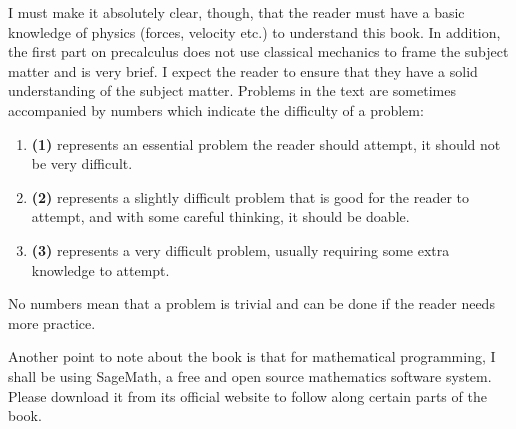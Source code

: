 \documentclass[envcountchap]{SNmono}
\begin{document}
  I must make it absolutely clear, though, that the reader must have a basic knowledge of physics (forces, velocity etc.) to understand this book. In addition, the first part on precalculus does not use classical mechanics to frame the subject matter and is very brief. I expect the reader to ensure that they have a solid understanding of the subject matter. Problems in the text are sometimes accompanied by numbers which indicate the difficulty of a problem:
  \begin{enumerate}
    \item{\textbf{(1)} represents an essential problem the reader should attempt, it should not be very difficult.}
    \item{\textbf{(2)} represents a slightly difficult problem that is good for the reader to attempt, and with some careful thinking, it should be doable.}
    \item{\textbf{(3)} represents a very difficult problem, usually requiring some extra knowledge to attempt.}
  \end{enumerate}


  No numbers mean that a problem is trivial and can be done if the reader needs more practice. 


  Another point to note about the book is that for mathematical programming, I shall be using SageMath, a free and open source mathematics software system. Please download it from its official website to follow along certain parts of the book. 
  \raggedbottom
  \tableofcontents
  \mainmatter
  
  
  
  
  
  
  
  
  
  
  
  
  
 
\end{document}
